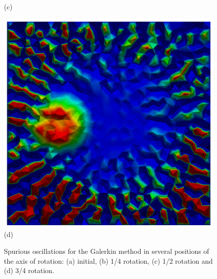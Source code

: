 \begin{figure}[H]
\begin{minipage}{.5\linewidth}
      (c)
     \end{minipage}%
     \begin{minipage}{.5\linewidth}
      \centering
      \includegraphics[scale=0.21]{./02_chaps/cap_validation/figure/galerkin_950.png}\\
      (d)
     \end{minipage}
     \medskip
     \caption{
Spurious oscillations for the Galerkin method in several positions of the axis of rotation:	
     (a) initial, 
     (b) 1/4 rotation,
     (c) 1/2 rotation and
     (d) 3/4 rotation.}
     \label{galerkin}
\end{figure}

